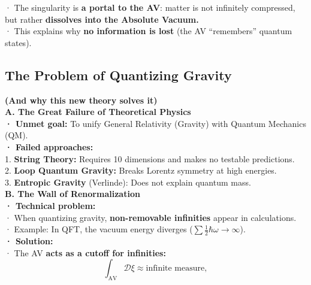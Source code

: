 \documentclass[a4paper]{article}
\theoremstyle{definition}
\theoremstyle{remark}
\numberwithin{equation}{section}
\begin{document}
· The singularity is \textbf{a portal to the AV}: matter is not infinitely compressed, but rather \textbf{dissolves into the Absolute Vacuum.}\\

· This explains why \textbf{no information is lost} (the AV ``remembers'' quantum states).\\

\subsection{The Problem of Quantizing Gravity}

\textbf{(And why this new theory solves it)}\\

\textbf{A. The Great Failure of Theoretical Physics}\\

\textbf{· Unmet goal:} To unify General Relativity (Gravity) with Quantum Mechanics (QM).\\

\textbf{· Failed approaches:}\\

1. \textbf{String Theory:} Requires 10 dimensions and makes no testable predictions.\\

2. \textbf{Loop Quantum Gravity:} Breaks Lorentz symmetry at high energies.\\

3. \textbf{Entropic Gravity} (Verlinde): Does not explain quantum mass.\\

\textbf{B. The Wall of Renormalization}\\

\textbf{· Technical problem:}\\

· When quantizing gravity, \textbf{non-removable infinities} appear in calculations.\\

· Example: In QFT, the vacuum energy diverges (\(\sum \frac{1}{2} \hbar \omega \to \infty \)).\\

\textbf{· Solution:}\\

· The AV \textbf{acts as a cutoff for infinities:}\\

\[
\int_{\text{AV}} \mathcal{D} \xi \approx \text{infinite measure},
\]
\end{document}
